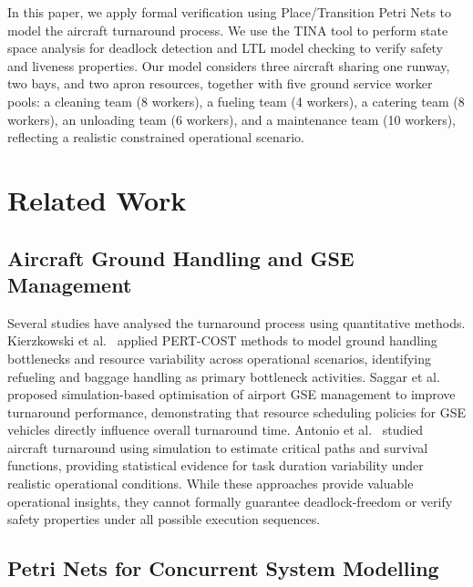 \documentclass[conference]{IEEEtran}
\begin{document}
In this paper, we apply formal verification using Place/Transition Petri Nets to
model the aircraft turnaround process. We use the TINA tool to perform state
space analysis for deadlock detection and LTL model checking to verify safety
and liveness properties. Our model considers three aircraft sharing one runway,
two bays, and two apron resources, together with five ground service worker
pools: a cleaning team (8 workers), a fueling team (4 workers), a catering team
(8 workers), an unloading team (6 workers), and a maintenance team (10 workers),
reflecting a realistic constrained operational scenario.


\section{Related Work}

\subsection{Aircraft Ground Handling and GSE Management}

Several studies have analysed the turnaround process using quantitative methods.
Kierzkowski et al.~\cite{b2} applied PERT-COST methods to model ground handling
bottlenecks and resource variability across operational scenarios, identifying
refueling and baggage handling as primary bottleneck activities. Saggar
et al.~\cite{b1} proposed simulation-based optimisation of airport GSE management
to improve turnaround performance, demonstrating that resource scheduling
policies for GSE vehicles directly influence overall turnaround time. Antonio
et al.~\cite{b3} studied aircraft turnaround using simulation to estimate
critical paths and survival functions, providing statistical evidence for task
duration variability under realistic operational conditions. While these
approaches provide valuable operational insights, they cannot formally guarantee
deadlock-freedom or verify safety properties under all possible execution
sequences.

\subsection{Petri Nets for Concurrent System Modelling}
\end{document}
